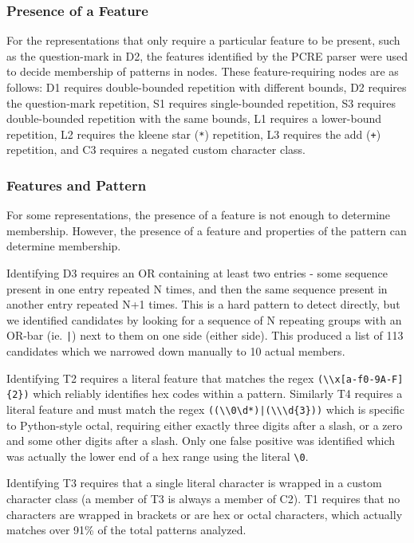 \subsubsection{Presence of a Feature}
For the representations that only require a particular feature to be present, such as the question-mark in D2, the features identified by the PCRE parser were used to decide membership of patterns in nodes.
These feature-requiring nodes are as follows: D1 requires double-bounded repetition with different bounds, D2 requires the question-mark repetition, S1 requires single-bounded repetition, S3 requires double-bounded repetition with the same bounds,  L1 requires a lower-bound repetition, L2 requires the kleene star (\verb!*!) repetition, L3 requires the add (\verb!+!) repetition, and C3 requires a negated custom character class.

\subsubsection{Features  and Pattern}
For some representations, the presence of a feature is not enough to determine membership.
However,  the presence of a feature and properties of the pattern can determine membership.


Identifying D3 requires an OR containing at least two entries - some sequence present in one entry repeated N times, and then the same sequence present in another entry repeated N+1 times.  This is a hard pattern to detect directly, but we identified candidates by looking for a sequence of N repeating groups with an OR-bar (ie. \verb!|!) next to them on one side (either side).  This produced a list of 113 candidates which we narrowed down manually to 10 actual members.


Identifying T2 requires a literal feature that matches the regex \verb!(\\x[a-f0-9A-F]{2})! which reliably identifies hex codes within a pattern.
Similarly T4 requires a literal feature and must match the regex \verb!((\\0\d*)|(\\\d{3}))! which is specific to Python-style octal, requiring either exactly three digits after a slash, or a zero and some other digits after a slash.  Only one false positive was identified which was actually the lower end of a hex range using the literal \verb!\0!.

Identifying T3 requires that a single literal character is wrapped in a custom character class (a member of T3 is always a member of C2).
 T1 requires that no characters are wrapped in brackets or are hex or octal characters, which actually matches over 91\% of the total patterns analyzed.

